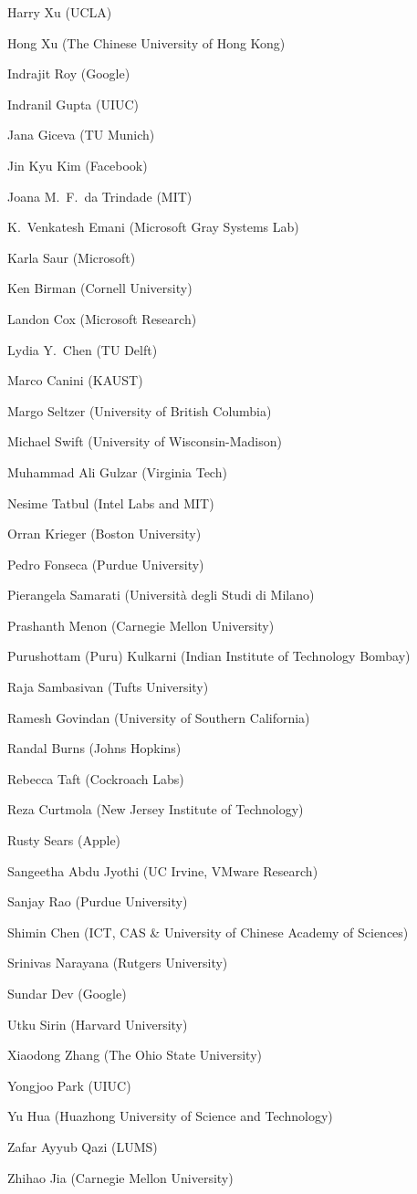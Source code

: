Harry Xu (UCLA)

Hong Xu (The Chinese University of Hong Kong)

Indrajit Roy (Google)

Indranil Gupta (UIUC)

Jana Giceva (TU Munich)

Jin Kyu Kim (Facebook)

Joana M.\ F.\ da Trindade (MIT)

K.\ Venkatesh Emani (Microsoft Gray Systems Lab)

Karla Saur (Microsoft)

Ken Birman (Cornell University)

Landon Cox (Microsoft Research)

Lydia Y.\ Chen (TU Delft)

Marco Canini (KAUST)

Margo Seltzer (University of British Columbia)

Michael Swift (University of Wisconsin-Madison)

Muhammad Ali Gulzar (Virginia Tech)

Nesime Tatbul (Intel Labs and MIT)

Orran Krieger (Boston University)

Pedro Fonseca (Purdue University)

Pierangela Samarati (Universit\`{a} degli Studi di Milano)

Prashanth Menon (Carnegie Mellon University)

Purushottam (Puru) Kulkarni (Indian Institute of Technology Bombay)

Raja Sambasivan (Tufts University)

Ramesh Govindan (University of Southern California)

Randal Burns (Johns Hopkins)

Rebecca Taft (Cockroach Labs)

Reza Curtmola (New Jersey Institute of Technology)

Rusty Sears (Apple)

Sangeetha Abdu Jyothi (UC Irvine, VMware Research)

Sanjay Rao (Purdue University)

Shimin Chen (ICT, CAS \& University of Chinese Academy of Sciences)

Srinivas Narayana (Rutgers University)

Sundar Dev (Google)

Utku Sirin (Harvard University)

Xiaodong Zhang (The Ohio State University)

Yongjoo Park (UIUC)

Yu Hua (Huazhong University of Science and Technology)

Zafar Ayyub Qazi (LUMS)

Zhihao Jia (Carnegie Mellon University)



